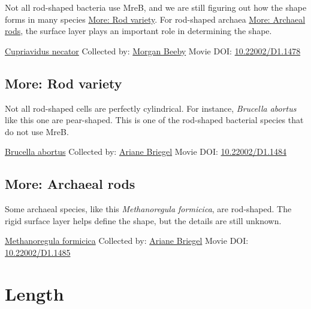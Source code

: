\documentclass[]{tufte-book}
\begin{document}
Not all rod-shaped bacteria use MreB, and we are still figuring out how the shape forms in many species \protect\hyperlink{Rod_variety}{More: Rod variety}. For rod-shaped archaea \protect\hyperlink{Archaeal_rods}{More: Archaeal rods}, the surface layer plays an important role in determining the shape.



\hypertarget{htmlwidget-89b3ff6e69a8bd30bc73}{}

\label{fig:3-2}\protect\hyperlink{tree}{Cupriavidus necator} Collected by: \protect\hyperlink{morgan_beeby}{Morgan Beeby} Movie DOI: \href{https://doi.org/10.22002/D1.1478}{10.22002/D1.1478}

\hypertarget{Rod_variety}{%
\subsection*{More: Rod variety}\label{Rod_variety}}

Not all rod-shaped cells are perfectly cylindrical. For instance, \emph{Brucella abortus} like this one are pear-shaped. This is one of the rod-shaped bacterial species that do not use MreB.



\hypertarget{htmlwidget-0de9c1a3b62437858cc0}{}

\label{fig:3-2a}\protect\hyperlink{tree}{Brucella abortus} Collected by: \protect\hyperlink{ariane_briegel}{Ariane Briegel} Movie DOI: \href{https://doi.org/10.22002/D1.1484}{10.22002/D1.1484}

\hypertarget{Archaeal_rods}{%
\subsection*{More: Archaeal rods}\label{Archaeal_rods}}

Some archaeal species, like this \emph{Methanoregula formicica}, are rod-shaped. The rigid surface layer helps define the shape, but the details are still unknown.



\hypertarget{htmlwidget-81485ea9e7cf819feaf1}{}

\label{fig:3-2b}\protect\hyperlink{tree}{Methanoregula formicica} Collected by: \protect\hyperlink{ariane_briegel}{Ariane Briegel} Movie DOI: \href{https://doi.org/10.22002/D1.1485}{10.22002/D1.1485}

\hypertarget{length}{%
\section{Length}\label{length}}
\end{document}
